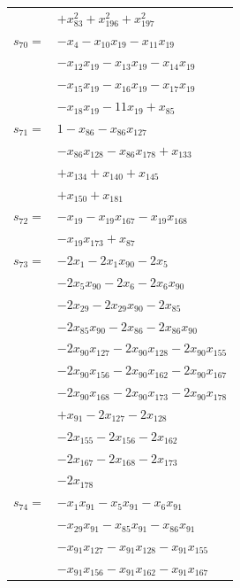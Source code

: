 \begin{longtable}{@{}r@{\;}l@{}}
 & \(\displaystyle +x_{83}^{2} +x_{196}^{2} +x_{197}^{2}\) \\[3pt]
\(s_{70}=\) & \(\displaystyle -x_{4} -x_{10}x_{19} -x_{11}x_{19}\) \\
 & \(\displaystyle -x_{12}x_{19} -x_{13}x_{19} -x_{14}x_{19}\) \\
 & \(\displaystyle -x_{15}x_{19} -x_{16}x_{19} -x_{17}x_{19}\) \\
 & \(\displaystyle -x_{18}x_{19} -11x_{19} +x_{85}\) \\[3pt]
\(s_{71}=\) & \(\displaystyle 1 -x_{86} -x_{86}x_{127}\) \\
 & \(\displaystyle -x_{86}x_{128} -x_{86}x_{178} +x_{133}\) \\
 & \(\displaystyle +x_{134} +x_{140} +x_{145}\) \\
 & \(\displaystyle +x_{150} +x_{181}\) \\[3pt]
\(s_{72}=\) & \(\displaystyle -x_{19} -x_{19}x_{167} -x_{19}x_{168}\) \\
 & \(\displaystyle -x_{19}x_{173} +x_{87}\) \\[3pt]
\(s_{73}=\) & \(\displaystyle -2x_{1} -2x_{1}x_{90} -2x_{5}\) \\
 & \(\displaystyle -2x_{5}x_{90} -2x_{6} -2x_{6}x_{90}\) \\
 & \(\displaystyle -2x_{29} -2x_{29}x_{90} -2x_{85}\) \\
 & \(\displaystyle -2x_{85}x_{90} -2x_{86} -2x_{86}x_{90}\) \\
 & \(\displaystyle -2x_{90}x_{127} -2x_{90}x_{128} -2x_{90}x_{155}\) \\
 & \(\displaystyle -2x_{90}x_{156} -2x_{90}x_{162} -2x_{90}x_{167}\) \\
 & \(\displaystyle -2x_{90}x_{168} -2x_{90}x_{173} -2x_{90}x_{178}\) \\
 & \(\displaystyle +x_{91} -2x_{127} -2x_{128}\) \\
 & \(\displaystyle -2x_{155} -2x_{156} -2x_{162}\) \\
 & \(\displaystyle -2x_{167} -2x_{168} -2x_{173}\) \\
 & \(\displaystyle -2x_{178}\) \\[3pt]
\(s_{74}=\) & \(\displaystyle -x_{1}x_{91} -x_{5}x_{91} -x_{6}x_{91}\) \\
 & \(\displaystyle -x_{29}x_{91} -x_{85}x_{91} -x_{86}x_{91}\) \\
 & \(\displaystyle -x_{91}x_{127} -x_{91}x_{128} -x_{91}x_{155}\) \\
 & \(\displaystyle -x_{91}x_{156} -x_{91}x_{162} -x_{91}x_{167}\) \\

\end{longtable}
